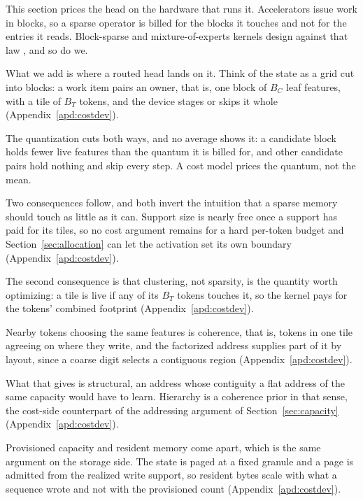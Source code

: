 This section prices the head on the hardware that runs it. Accelerators issue work in blocks, so a sparse operator is billed for the blocks it touches and not for the entries it reads. Block-sparse and mixture-of-experts kernels design against that law \citep{chen2022pixelated, guo2025sonicmoe}, and so do we.

What we add is where a routed head lands on it. Think of the state as a grid cut into blocks: a work item pairs an owner, that is, one block of $B_C$ leaf features, with a tile of $B_T$ tokens, and the device stages or skips it whole (Appendix~\ref{apd:costdev}).

The quantization cuts both ways, and no average shows it: a candidate block holds fewer live features than the quantum it is billed for, and other candidate pairs hold nothing and skip every step.  A cost model prices the quantum, not the mean.


Two consequences follow, and both invert the intuition that a sparse memory should touch as little as it can. Support size is nearly free once a support has paid for its tiles, so no cost argument remains for a hard per-token budget and Section~\ref{sec:allocation} can let the activation set its own boundary (Appendix~\ref{apd:costdev}).

The second consequence is that clustering, not sparsity, is the quantity worth optimizing: a tile is live if any of its $B_T$ tokens touches it, so the kernel pays for the tokens' combined footprint (Appendix~\ref{apd:costdev}).

Nearby tokens choosing the same features is coherence, that is, tokens in one tile agreeing on where they write, and the factorized address supplies part of it by layout, since a coarse digit selects a contiguous region (Appendix~\ref{apd:costdev}).

What that gives is structural, an address whose contiguity a flat address of the same capacity would have to learn. Hierarchy is a coherence prior in that sense, the cost-side counterpart of the addressing argument of Section~\ref{sec:capacity} (Appendix~\ref{apd:costdev}).

Provisioned capacity and resident memory come apart, which is the same argument on the storage side. The state is paged at a fixed granule and a page is admitted from the realized write support, so resident bytes scale with what a sequence wrote and not with the provisioned count (Appendix~\ref{apd:costdev}).

